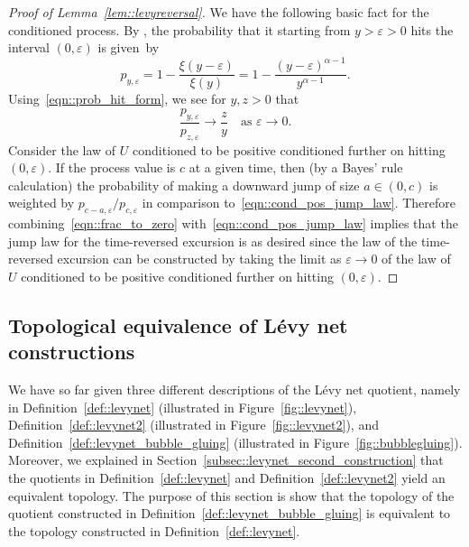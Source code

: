 \documentclass[JEP,XML,SOM,Unicode]{cedram}
\let\epsilon\varepsilon
\theoremstyle{plain}
\numberwithin{theorem}{section}
\theoremstyle{definition}
\begin{document}
\begin{proof}[Proof of Lemma~\ref{lem::levyreversal}]
We have the following basic fact for the conditioned process. By \cite[Chap.\,VII, Lem.\,12]{bertoinlevybook}, the probability that it starting from $y\!>\!\epsilon\!>\!0$ hits the interval $(0,\epsilon)$ is given~by\vspace*{-5pt}\enlargethispage{.5\baselineskip}%
\begin{equation}
\label{eqn::prob_hit_form}
p_{y,\epsilon} = 1-\frac{\xi(y-\epsilon)}{\xi(y)} = 1 - \frac{(y-\epsilon)^{\alpha-1}}{y^{\alpha-1}}.
\end{equation}
Using~\eqref{eqn::prob_hit_form}, we see for $y,z > 0$ that\vspace*{-3pt}
\begin{equation}
\label{eqn::frac_to_zero}
\frac{p_{y,\epsilon}}{p_{z,\epsilon}} \to \frac{z}{y} \quad\text{as $\textstyle \epsilon \to 0$}.
\end{equation}
Consider the law of $U$ conditioned to be positive conditioned further on hitting $(0,\epsilon)$. If the process value is $c$ at a given time, then (by a Bayes' rule calculation) the probability of making a downward jump of size $a \in (0,c)$ is weighted by $p_{c-a,\epsilon}/p_{c,\epsilon}$ in comparison to~\eqref{eqn::cond_pos_jump_law}. Therefore combining~\eqref{eqn::frac_to_zero} with~\eqref{eqn::cond_pos_jump_law} implies that the jump law for the time-reversed excursion is as desired since the law of the time-reversed excursion can be constructed by taking the limit as $\epsilon \to 0$ of the law of $U$ conditioned to be positive conditioned further on hitting $(0,\epsilon)$.
\end{proof}

\subsection{Topological equivalence of Lévy net constructions}
\label{subsec::levy_net_top_equiv}

We have so far given three different descriptions of the Lévy net quotient, namely in Definition~\ref{def::levynet} (illustrated in Figure~\ref{fig::levynet}), Definition~\ref{def::levynet2} (illustrated in Figure~\ref{fig::levynet2}), and Definition~\ref{def::levynet_bubble_gluing} (illustrated in Figure~\ref{fig::bubblegluing}). Moreover, we explained in Section~\ref{subsec::levynet_second_construction} that the quotients in Definition~\ref{def::levynet} and Definition~\ref{def::levynet2} yield an equivalent topology. The purpose of this section is show that the topology of the quotient constructed in Definition~\ref{def::levynet_bubble_gluing} is equivalent to the topology constructed in Definition~\ref{def::levynet}.
\end{document}
